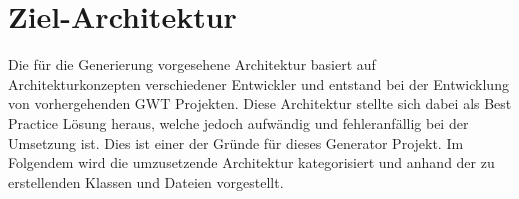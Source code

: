 \section{Ziel-Architektur}\label{AufBZielArchitektur}
Die für die Generierung vorgesehene Architektur basiert auf 
Architekturkonzepten verschiedener Entwickler und entstand bei der Entwicklung
von vorhergehenden GWT Projekten. Diese Architektur stellte sich dabei als
\glqq{}Best Practice\grqq{} Lösung heraus, welche jedoch aufwändig und
fehleranfällig bei der Umsetzung ist. Dies ist einer der Gründe für dieses Generator Projekt.
Im Folgendem wird die umzusetzende Architektur kategorisiert und anhand der zu
erstellenden Klassen und Dateien vorgestellt.\\
